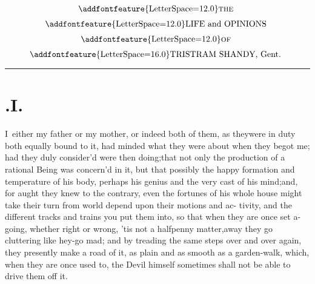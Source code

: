 \documentclass{article}
\begin{document}
\newpage\null
\thispagestyle{empty}
\newpage
\setcounter{page}{1}
\pagestyle{folio}
\thispagestyle{empty}
\[\vbox{\openup 6pt\halign{\hss # \hss\cr
\addfontfeature{LetterSpace=12.0}\textsc{the}\cr
\addfontfeature{LetterSpace=12.0}LIFE and OPINIONS\cr
\addfontfeature{LetterSpace=12.0}\textsc{of}\cr
{\addfontfeature{LetterSpace=16.0}TRISTRAM SHANDY}, Gent.\cr}}\]

\vskip 6pt
\hrule
\setlength{\baselineskip}{14pt}  %

\section{.\enspace I.}

\lettrine{I}{\,} either my father or my mother,
or indeed both of them, as
they\break were in duty both equally bound to it, had minded what they were about
when they begot me; had they duly consider’d 
were then doing;\tsk  that not only the production of a rational Being
was concern’d in it, but that possibly the happy formation and temperature of
his body, 
perhaps his genius and the very cast of\break
his mind;\tsk  and, for aught they knew to the contrary, even the fortunes of his
whole house might take their turn from 
world depend upon their motions and ac-
tivity, and the different tracks and trains you put them into, so that when they are
once set a-going, whether right or wrong, ’tis not a halfpenny matter,\tsk away
they go cluttering like hey-go mad; and by treading the same steps over and over
again, they presently make a road of it, as plain and as smooth as a garden-walk,
which, when they are once used to, the Devil himself sometimes shall not be able to
drive them off it.
\end{document}
